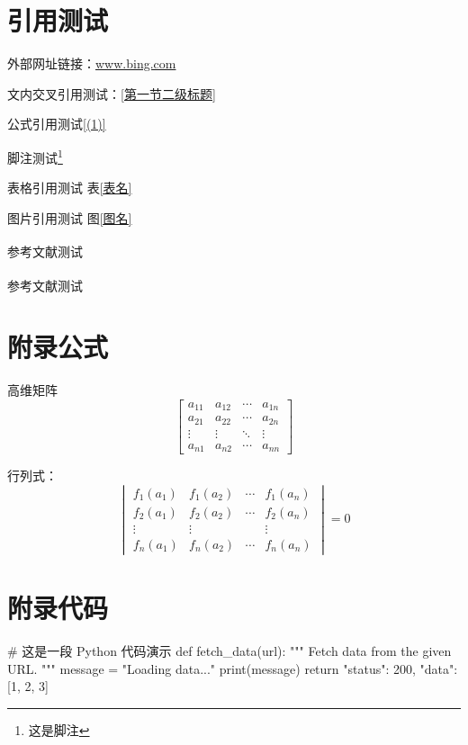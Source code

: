 \documentclass[a4paper,AutoFakeBold={2.7},UTF8,zihao=5,twoside]{ctexart} %
\numberwithin{equation}{section}%
\begin{document}
\clearpage

\appendix
{}%

\section{引用测试}

外部网址链接：\url{www.bing.com}

文内交叉引用测试：\ref{第一节二级标题}

公式引用测试\ref{(1)}

脚注测试\footnote{这是脚注}

表格引用测试 表\ref{表名}

图片引用测试 图\ref{图名}

参考文献测试\textsuperscript{\cite{参考文献1}}

参考文献测试\textsuperscript{\cite{参考文献1}\cite{参考文献2}}

\clearpage

\section{附录公式}

高维矩阵
\begin{equation}
	\begin{bmatrix}
		a_{11} & a_{12} & \cdots & a_{1n} \\
		a_{21} & a_{22} & \cdots & a_{2n} \\
		\vdots & \vdots & \ddots & \vdots \\
		a_{n1} & a_{n2} & \cdots & a_{nn}
	\end{bmatrix}
\end{equation}

行列式：
\begin{equation}
  \begin{vmatrix}
    f_1(a_1) & f_1(a_2) & \cdots & f_1(a_n) \\
    f_2(a_1) & f_2(a_2) & \cdots & f_2(a_n) \\
    \vdots   & \vdots   &        & \vdots   \\
    f_n(a_1) & f_n(a_2) & \cdots & f_n(a_n)
  \end{vmatrix}
  = 0
\end{equation}

\clearpage

\section{附录代码}

\begin{code}[Python]
# 这是一段 Python 代码演示
def fetch_data(url):
    """
    Fetch data from the given URL.
    """
    message = "Loading data..."
    print(message)
    return {"status": 200, "data": [1, 2, 3]}
\end{code}
\end{document}
